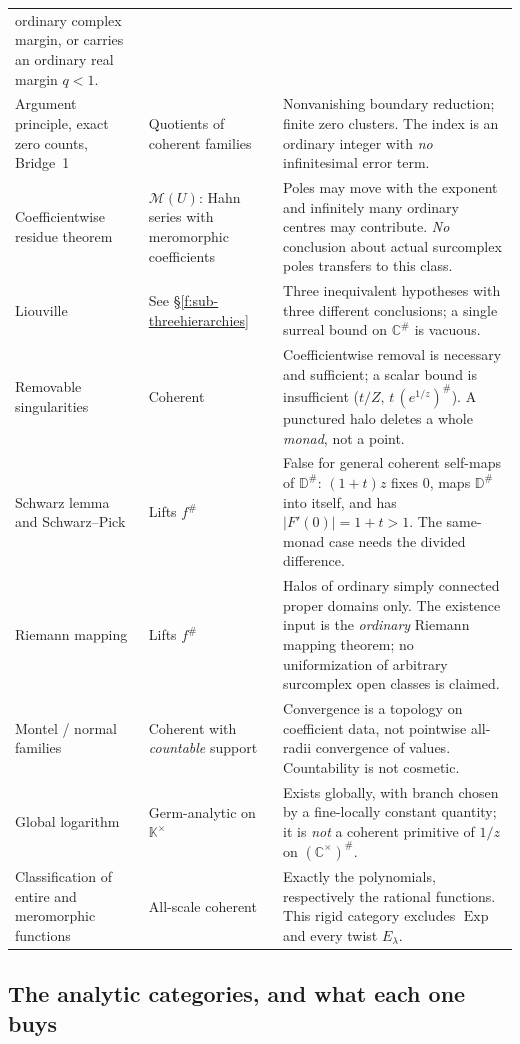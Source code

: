 \documentclass[11pt,a4paper]{article}
\numberwithin{equation}{section}
\theoremstyle{definition}
\theoremstyle{remark}
\theoremstyle{plain}
\newcommand{\K}{\mathbb K}
\newcommand{\CC}{\mathbb C}
\DeclareMathOperator{\Exp}{Exp}
\newcommand{\halo}[1]{#1^{\#}}
\newcommand{\ev}[1]{#1^{\#}}
\newcommand{\Mc}{\mathcal M}
\newcommand{\abs}[1]{\lvert #1\rvert}
\begin{document}
\begin{center}
\begin{longtable}{@{}>{\raggedright\arraybackslash}p{}
                    >{\raggedright\arraybackslash}p{}
                    >{\raggedright\arraybackslash}p{}@{}}
ordinary complex margin, or carries an ordinary real margin $q<1$.\\[3pt]
Argument principle, exact zero counts, Bridge~1 &
Quotients of coherent families &
Nonvanishing boundary reduction; finite zero clusters.  The index is an
ordinary integer with \emph{no} infinitesimal error term.\\[3pt]
Coefficientwise residue theorem &
$\Mc(U)$: Hahn series with meromorphic coefficients &
Poles may move with the exponent and infinitely many ordinary centres
may contribute.  \emph{No} conclusion about actual surcomplex poles
transfers to this class.\\[3pt]
Liouville &
See \S\ref{f:sub-threehierarchies} &
Three inequivalent hypotheses with three different conclusions; a single
surreal bound on $\halo\CC$ is vacuous.\\[3pt]
Removable singularities &
Coherent &
Coefficientwise removal is necessary and sufficient; a scalar bound is
insufficient ($t/Z$, $t\,\ev{(e^{1/z})}$).  A punctured halo deletes a
whole \emph{monad}, not a point.\\[3pt]
Schwarz lemma and Schwarz--Pick &
Lifts $\ev f$ &
False for general coherent self-maps of $\halo{\mathbb D}$: $(1+t)z$
fixes $0$, maps $\halo{\mathbb D}$ into itself, and has
$\abs{F'(0)}=1+t>1$.  The same-monad case needs the divided
difference.\\[3pt]
Riemann mapping &
Lifts $\ev f$ &
Halos of ordinary simply connected proper domains only.  The existence
input is the \emph{ordinary} Riemann mapping theorem; no uniformization
of arbitrary surcomplex open classes is claimed.\\[3pt]
Montel / normal families &
Coherent with \emph{countable} support &
Convergence is a topology on coefficient data, not pointwise
all-radii convergence of values.  Countability is not cosmetic.\\[3pt]
Global logarithm &
Germ-analytic on $\K^{\times}$ &
Exists globally, with branch chosen by a fine-locally constant
quantity; it is \emph{not} a coherent primitive of $1/z$ on
$\halo{(\CC^{\times})}$.\\[3pt]
Classification of entire and meromorphic functions &
All-scale coherent &
Exactly the polynomials, respectively the rational functions.  This
rigid category excludes $\Exp$ and every twist $E_{\lambda}$.\\
\end{longtable}
\end{center}

\subsection{The analytic categories, and what each one buys}
\label{f:sub-categories}
\end{document}

